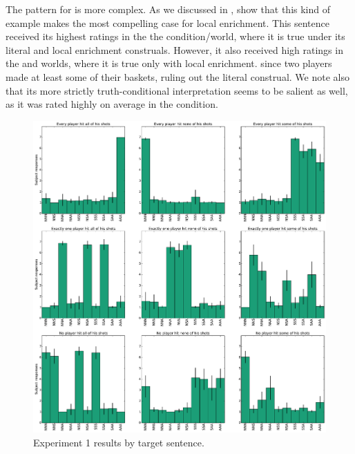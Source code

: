 \documentclass[leqno]{article}
\begin{document}
The pattern for  is
more complex. As we discussed in ,
\citeauthor{Chemla:Spector:2011} show that this kind of example makes
the most compelling case for local enrichment. This sentence received
its highest ratings in the the  condition/world, where it
is true under its literal and local enrichment construals. However, it
also received high ratings in the  and  worlds,
where it is true only with local enrichment. since two players made at
least some of their baskets, ruling out the literal construal.  We
note also that its more strictly truth-conditional interpretation
seems to be salient as well, as it was rated highly on average in the
 condition.

\begin{figure}[tp]
  \centering
  \includegraphics[width=1\textwidth]{fig/basketball-pilot-2-11-14-results-parsed}
  \caption{Experiment 1 results by target sentence.}
  \label{fig:exp1-results}
\end{figure}
\end{document}
